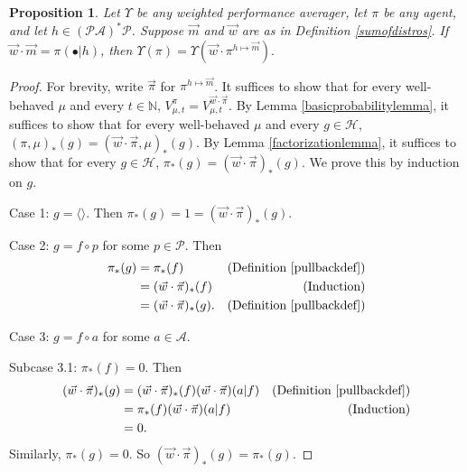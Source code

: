 \documentclass{article}
\newtheorem{proposition}[theorem]{Proposition}
\begin{document}
\begin{proposition}
\label{longproposition}
    Let $\Upsilon$ be any weighted performance averager, let $\pi$ be any agent,
    and let $h\in(\mathcal P\mathcal A)^*\mathcal P$.
    Suppose $\vec m$ and $\vec w$ are as in Definition \ref{sumofdistros}.
    If $\vec w\cdot\vec m = \pi(\bullet|h)$, then
    $
        \Upsilon(\pi)
        =
        \Upsilon(\vec w\cdot \pi^{h\mapsto \vec m}).
    $
\end{proposition}

\begin{proof}
    For brevity, write $\vec\pi$ for $\pi^{h\mapsto \vec m}$. It suffices to
    show that for every well-behaved $\mu$ and every $t\in\mathbb N$,
    $
        V^{\pi}_{\mu,t}
        =
        V^{\vec w\cdot \vec\pi}_{\mu,t}.
    $
    By Lemma \ref{basicprobabilitylemma}, it suffices to show that for every
    well-behaved $\mu$ and every $g\in\mathcal H$,
    $
    (\pi,\mu)_*(g)
    =
    (\vec w\cdot\vec\pi,\mu)_*(g)
    $.
    By Lemma \ref{factorizationlemma}, it suffices
    to show that for every $g\in\mathcal H$,
    $\pi_*(g)=(\vec w\cdot\vec\pi)_*(g)$.
    We prove this by induction on $g$.

    Case 1: $g=\langle\rangle$.
    Then $\pi_*(g)=1
    =(\vec w\cdot\vec\pi)_*(g)$.

    Case 2: $g=f\circ p$ for some $p\in\mathcal P$.
    Then
    \begin{align*}
        \pi_*(g)
            &= \pi_*(f)
                &\mbox{(Definition \ref{pullbackdef})}\\
            &= (\vec w\cdot\vec\pi)_*(f)
                &\mbox{(Induction)}\\
            &= (\vec w\cdot\vec\pi)_*(g).
                &\mbox{(Definition \ref{pullbackdef})}
    \end{align*}

    Case 3: $g=f\circ a$ for some $a\in\mathcal A$.

    Subcase 3.1: $\pi_*(f)=0$.
    Then
    \begin{align*}
        (\vec w\cdot\vec\pi)_*(g)
            &= (\vec w\cdot\vec\pi)_*(f)
            (\vec w\cdot\vec\pi)(a|f)
                &\mbox{(Definition \ref{pullbackdef})}\\
            &= \pi_*(f)(\vec w\cdot\vec\pi)(a|f)
                &\mbox{(Induction)}\\
            &= 0.
    \end{align*}
    Similarly, $\pi_*(g)=0$. So $(\vec w\cdot\vec\pi)_*(g)=\pi_*(g)$.


\end{proof}
\end{document}
